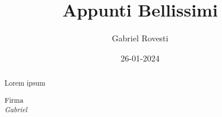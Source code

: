 \documentclass[a4paper,11pt]{report}
\begin{document}
\title{Appunti Bellissimi}
\author{Gabriel Rovesti}
\date{26-01-2024}

\maketitle



\begin{abstract}
	Lorem ipsum
	\begin{flushright}
		Firma \\
		\emph{Gabriel}
	\end{flushright}
	
	
\end{abstract}

\hypersetup{linkcolor=black}
\tableofcontents
\listoffigures

\newpage

\hypersetup{linkcolor=blue, urlcolor=blue}



\begin{appendices}



\end{appendices}

	
\end{document}
